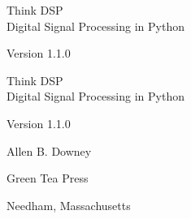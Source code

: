 \documentclass[12pt]{book}
\newcommand{\theversion}{1.1.0}
\begin{document}
\begin{latexonly}

\renewcommand{\topfraction}{0.9}
\renewcommand{\blankpage}{\thispagestyle{empty} \quad \newpage}


\thispagestyle{empty}

\begin{flushright}
\vspace*{2.0in}

\begin{spacing}{3}
{\huge Think DSP}\\
{\Large Digital Signal Processing in Python}
\end{spacing}

\vspace{0.25in}

Version \theversion

\vfill

\end{flushright}


\blankpage
\blankpage

\pagebreak
\thispagestyle{empty}

\begin{flushright}
\vspace*{2.0in}

\begin{spacing}{3}
{\huge Think DSP}\\
{\Large Digital Signal Processing in Python}
\end{spacing}

\vspace{0.25in}

Version \theversion

\vspace{1in}


{\Large
Allen B. Downey\\
}


\vspace{0.5in}

{\Large Green Tea Press}

{\small Needham, Massachusetts}

\vfill

\end{flushright}



\end{latexonly}
\end{document}
